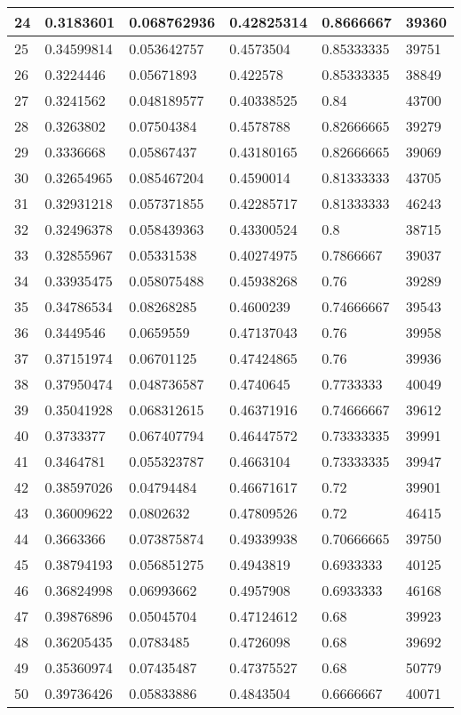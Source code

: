 \begin{longtable}{|l|l|l|l|l|l|}
24 & 0.3183601 & 0.068762936 & 0.42825314 & 0.8666667 & 39360 \\ \hline 
25 & 0.34599814 & 0.053642757 & 0.4573504 & 0.85333335 & 39751 \\ \hline 
26 & 0.3224446 & 0.05671893 & 0.422578 & 0.85333335 & 38849 \\ \hline 
27 & 0.3241562 & 0.048189577 & 0.40338525 & 0.84 & 43700 \\ \hline 
28 & 0.3263802 & 0.07504384 & 0.4578788 & 0.82666665 & 39279 \\ \hline 
29 & 0.3336668 & 0.05867437 & 0.43180165 & 0.82666665 & 39069 \\ \hline 
30 & 0.32654965 & 0.085467204 & 0.4590014 & 0.81333333 & 43705 \\ \hline 
31 & 0.32931218 & 0.057371855 & 0.42285717 & 0.81333333 & 46243 \\ \hline 
32 & 0.32496378 & 0.058439363 & 0.43300524 & 0.8 & 38715 \\ \hline 
33 & 0.32855967 & 0.05331538 & 0.40274975 & 0.7866667 & 39037 \\ \hline 
34 & 0.33935475 & 0.058075488 & 0.45938268 & 0.76 & 39289 \\ \hline 
35 & 0.34786534 & 0.08268285 & 0.4600239 & 0.74666667 & 39543 \\ \hline 
36 & 0.3449546 & 0.0659559 & 0.47137043 & 0.76 & 39958 \\ \hline 
37 & 0.37151974 & 0.06701125 & 0.47424865 & 0.76 & 39936 \\ \hline 
38 & 0.37950474 & 0.048736587 & 0.4740645 & 0.7733333 & 40049 \\ \hline 
39 & 0.35041928 & 0.068312615 & 0.46371916 & 0.74666667 & 39612 \\ \hline 
40 & 0.3733377 & 0.067407794 & 0.46447572 & 0.73333335 & 39991 \\ \hline 
41 & 0.3464781 & 0.055323787 & 0.4663104 & 0.73333335 & 39947 \\ \hline 
42 & 0.38597026 & 0.04794484 & 0.46671617 & 0.72 & 39901 \\ \hline 
43 & 0.36009622 & 0.0802632 & 0.47809526 & 0.72 & 46415 \\ \hline 
44 & 0.3663366 & 0.073875874 & 0.49339938 & 0.70666665 & 39750 \\ \hline 
45 & 0.38794193 & 0.056851275 & 0.4943819 & 0.6933333 & 40125 \\ \hline 
46 & 0.36824998 & 0.06993662 & 0.4957908 & 0.6933333 & 46168 \\ \hline 
47 & 0.39876896 & 0.05045704 & 0.47124612 & 0.68 & 39923 \\ \hline 
48 & 0.36205435 & 0.0783485 & 0.4726098 & 0.68 & 39692 \\ \hline 
49 & 0.35360974 & 0.07435487 & 0.47375527 & 0.68 & 50779 \\ \hline 
50 & 0.39736426 & 0.05833886 & 0.4843504 & 0.6666667 & 40071 \\ \hline 
\end{longtable}